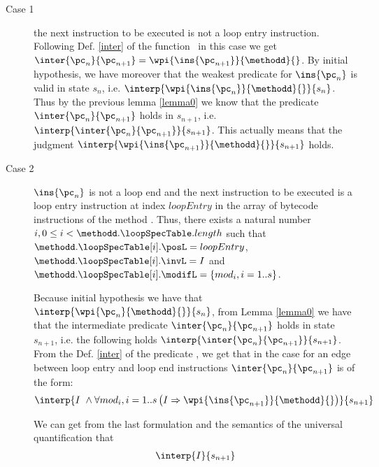   
\begin{description}
  \item [Case 1] the next instruction to be executed is not a loop entry instruction. 
           	Following Def. \ref{inter} of the function \interOnly \ in this case 
              we get $ \inter{\pc_n}{\pc_{n+1}} = \wpi{ \ins{\pc_{n+1} }}{\methodd}{}$. By initial hypothesis,
	       we have moreover that the weakest predicate for $\ins{\pc_{n}}$ is valid in 
	       state $s_n$, i.e.  $ \interp{\wpi{\ins{\pc_{n}} }{ \methodd }{} }{ s_n }$.
	      Thus by the previous lemma \ref{lemma0}  we know that 
	      the predicate $\inter{\pc_n}{\pc_{n+1}}$ holds in $s_{n+1}$, i.e. $\interp{\inter{\pc_n}{\pc_{n+1}} }{ s_{n+1} }$.
	      This actually means that the judgment 
	      $\interp{ \wpi{\ins{\pc_{n+1}}}{\methodd}{} }{ s_{n+1} }$	      holds.

 
  
\item [Case 2]
 $\ins{\pc_n} $ is not a loop end and the next instruction to be executed is a loop entry 
instruction at index $loopEntry $ in the array of bytecode instructions of the method \methodd{}.
 Thus, there exists a natural number  $ i , 0 \le i < \methodd.\loopSpecTable.length   $   such that
 $ \methodd. \loopSpecTable[i].\posL = loopEntry $,  $ \methodd. \loopSpecTable[i].\invL = I $ and
   $ \methodd. \loopSpecTable[i].\modifL =\{ mod_i, i = 1..s \}$.




Because initial hypothesis we have that  $\interp{\wpi{\pc_n}{\methodd}{}}{s_n} $, from Lemma \ref{lemma0} we have
that  the intermediate predicate $\inter{\pc_n}{\pc_{n+1}}$ holds in state $s_{n+1}$, i.e. the following holds
 $\interp{\inter{\pc_n}{\pc_{n+1}} }{s_{n+1}} $. 
From the  Def. \ref{inter} of the predicate \interOnly{}, we get that   
in the case for  an edge between loop entry and  loop end instructions  $\inter{\pc_n}{\pc_{n+1}}$ is of the form:
     \begin{equation*}
                 \interp{  I \  \wedge
                                             \forall mod_i ,  i = 1..s \left( I \Rightarrow \wpi{\ins{\pc_{n+1}}}{\methodd}{} \right) 
                                 }  { s_{n+1}  }
\end{equation*}
  
We can get from the last formulation and the semantics of the universal quantification  that 
 \begin{equation*} 
\begin{array}{l}
                  \interp{I}   {s_{n+1} } \\
                              

\end{array}
\end{equation*}
\end{description}
